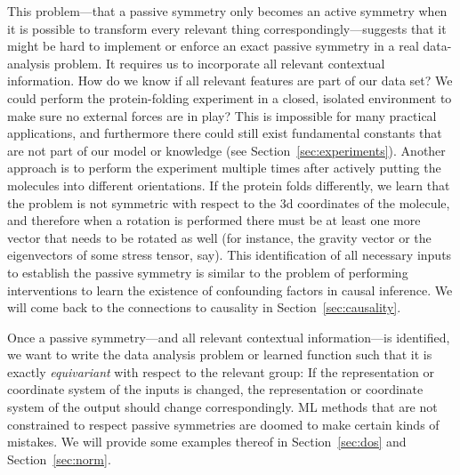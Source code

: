\documentclass[preprint]{article} %
\newcommand{\sectionname}{Section}
\newcommand{\secref}[1]{\sectionname~\ref{#1}}
\begin{document}
This problem---that a passive symmetry only becomes an active symmetry when it is possible to transform every relevant thing correspondingly---suggests that it might be hard to implement or enforce an exact passive symmetry in a real data-analysis problem.
It requires us to incorporate all relevant contextual information.
How do we know if all relevant features are part of our data set?
We could perform the protein-folding experiment in a closed, isolated environment to make sure no external forces are in play?
This is impossible for many practical applications, and furthermore there could still exist fundamental constants that are not part of our model or knowledge (see \secref{sec:experiments}).
Another approach is to perform the experiment multiple times after actively putting the molecules into different orientations.
If the protein folds differently, we learn that the problem is not symmetric with respect to the 3d coordinates of the molecule, and therefore when a rotation is performed there must be at least one more vector that needs to be rotated as well (for instance, the gravity vector or the eigenvectors of some stress tensor, say).
This identification of all necessary inputs to establish the passive symmetry is similar to the problem of performing interventions to learn the existence of confounding factors in causal inference.
We will come back to the connections to causality in \secref{sec:causality}.

Once a passive symmetry---and all relevant contextual information---is identified, we want to write the data analysis problem or learned function such that it is exactly \emph{equivariant} with respect to the relevant group:
If the representation or coordinate system of the inputs is changed, the representation or coordinate system of the output should change correspondingly.
ML methods that are not constrained to respect passive symmetries are doomed to make certain kinds of mistakes.
We will provide some examples thereof in \secref{sec:dos} and \secref{sec:norm}.
\end{document}
